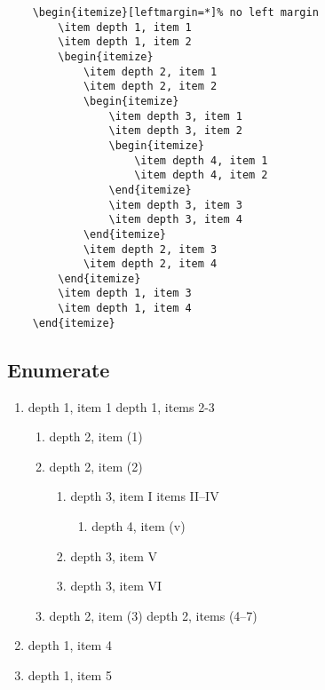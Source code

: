 \documentclass[itdr]{subfiles}
\begin{document}
\begin{lstlisting}
	\begin{itemize}[leftmargin=*]% no left margin
		\item depth 1, item 1
		\item depth 1, item 2
		\begin{itemize}
			\item depth 2, item 1
			\item depth 2, item 2
			\begin{itemize}
				\item depth 3, item 1
				\item depth 3, item 2
				\begin{itemize}
					\item depth 4, item 1
					\item depth 4, item 2
				\end{itemize}
				\item depth 3, item 3
				\item depth 3, item 4
			\end{itemize}
			\item depth 2, item 3
			\item depth 2, item 4
		\end{itemize}
		\item depth 1, item 3
		\item depth 1, item 4
	\end{itemize}
\end{lstlisting}

\break

\subsection{Enumerate}
\begin{enumerate}
	\item depth 1, item 1
	 depth 1, items 2-3
	\begin{enumerate}
		\item depth 2, item (1)
		\item depth 2, item (2)
		\begin{enumerate}
			\item depth 3, item I
			 items II--IV
			\begin{enumerate}
				 depth 4, items (i--iv)
				\item depth 4, item (v)
			\end{enumerate}
			\item depth 3, item V
			\item depth 3, item VI
		\end{enumerate}
		\item depth 2, item (3)
		 depth 2, items (4--7)
	\end{enumerate}
	\item depth 1, item 4
	\item depth 1, item 5
\end{enumerate}
\end{document}
